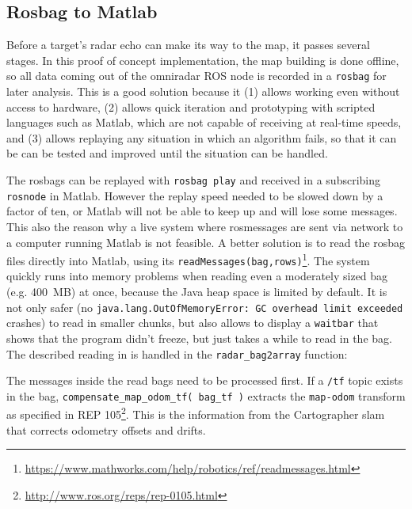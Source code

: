 \subsection{Rosbag to Matlab}\label{rosbag-to-matlab}

Before a target's radar echo can make its way to the map, it passes several stages. In this proof of concept implementation, the map building is done offline, so all data coming out of the omniradar ROS node is recorded in a \texttt{rosbag} for later analysis. This is a good solution because it (1) allows working even without access to hardware, (2) allows quick iteration and prototyping with scripted languages such as Matlab, which are not capable of receiving at real-time speeds, and (3) allows replaying any situation in which an algorithm fails, so that it can be can be tested and improved until the situation can be handled.

The rosbags can be replayed with \texttt{rosbag play} and received in a subscribing \texttt{rosnode} in Matlab. However the replay speed needed to be slowed down by a factor of ten, or Matlab will not be able to keep up and will lose some messages. This also the reason why a live system where rosmessages are sent via network to a computer running Matlab is not feasible. A better solution is to read the rosbag files directly into Matlab, using its \texttt{readMessages(bag,rows)}\footnote{\url{https://www.mathworks.com/help/robotics/ref/readmessages.html}}. The system quickly runs into memory problems when reading even a moderately sized bag (e.g. \SI{400}{MB}) at once, because the Java heap space is limited by default. It is not only safer (no \texttt{java.lang.OutOfMemoryError: GC overhead limit exceeded} crashes) to read in smaller chunks, but also allows to display a \texttt{waitbar} that shows that the program didn't freeze, but just takes a while to read in the bag. The described reading in is handled in the \texttt{radar\_bag2array} function:
\begin{Shaded}
\begin{Highlighting}[]
\end{Highlighting}
\end{Shaded}
The messages inside the read bags need to be processed first. If a \texttt{/tf} topic exists in the bag, \texttt{compensate\_map\_odom\_tf( bag\_tf )} extracts the \texttt{map-odom} transform as specified in REP 105\footnote{\url{http://www.ros.org/reps/rep-0105.html}}. This is the information from the Cartographer slam that corrects odometry offsets and drifts.

